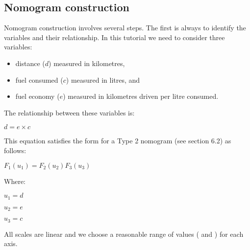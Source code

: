 \documentclass[a4paper,11pt,english]{sphinxmanual}
\begin{document}
\subsection{Nomogram construction}
\label{\detokenize{tutorials/tutorials:nomogram-construction}}
Nomogram construction involves several steps.  The first is always to identify the variables and their relationship. In this tutorial we need to consider three variables:
\begin{itemize}
\item {} 
distance (\(d\)) measured in kilometres,

\item {} 
fuel consumed (\(c\)) measured in litres, and

\item {} 
fuel economy  (\(e\)) measured in kilometres driven per litre consumed.

\end{itemize}

The relationship between these variables is:

\(d = {e\times c}\)

This equation satisfies the form for a Type 2 nomogram (see section 6.2) as follows:

\(F_1(u_1) = {F_2(u_2)F_3(u_3)}\)

Where:

\(u_1 = d\)

\(u_2 = e\)

\(u_3 = c\)

All scales are linear and we choose a reasonable range of values ( and ) for each axis.
\end{document}
